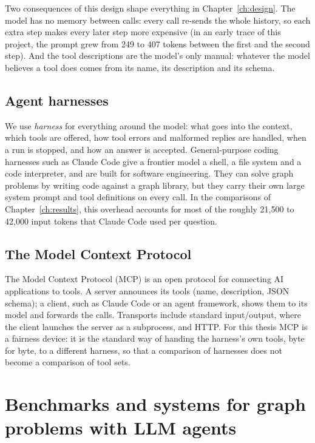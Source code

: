 Two consequences of this design shape everything in Chapter~\ref{ch:design}. The model has no memory between calls:
every call re-sends the whole history, so each extra step makes every later step more expensive (in an early trace of
this project, the prompt grew from 249 to 407 tokens between the first and the second step). And the tool
descriptions are the model's only manual: whatever the model believes a tool does comes from its name, its
description and its schema.

\subsection{Agent harnesses}

We use \emph{harness} for everything around the model: what goes into the context, which tools are offered, how tool
errors and malformed replies are handled, when a run is stopped, and how an answer is accepted. General-purpose
coding harnesses such as Claude Code \cite{claudecode} give a frontier model a shell, a file system and a code
interpreter, and are built for software engineering. They can solve graph problems by writing code against a graph
library, but they carry their own large system prompt and tool definitions on every call. In the comparisons of
Chapter~\ref{ch:results}, this overhead accounts for most of the roughly 21,500 to 42,000 input tokens that Claude Code
used per question.

\subsection{The Model Context Protocol}

The Model Context Protocol (MCP) \cite{mcp} is an open protocol for connecting AI applications to tools. A server
announces its tools (name, description, JSON schema); a client, such as Claude Code or an agent framework, shows them
to its model and forwards the calls. Transports include standard input/output, where the client launches the server
as a subprocess, and HTTP. For this thesis MCP is a fairness device: it is the standard way of handing the
harness's own tools, byte for byte, to a different harness, so that a comparison of harnesses does not become a
comparison of tool sets.

\section{Benchmarks and systems for graph problems with LLM agents}

